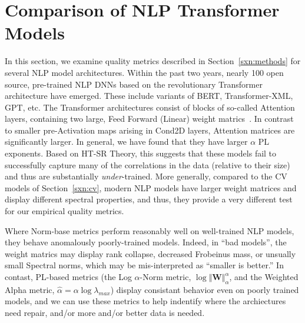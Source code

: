 \section{Comparison of NLP Transformer Models}
\label{sxn:nlp}

In this section, we examine quality metrics described in Section~\ref{sxn:methods} for several NLP model architectures.
%
Within the past two years, nearly 100 open source, pre-trained NLP DNNs based on the revolutionary Transformer architecture have emerged.
These include variants of BERT, Transformer-XML, GPT, etc.
%
The Transformer architectures consist of blocks of so-called Attention layers, containing two large, Feed Forward (Linear) weight matrics~\cite{Attn2017}. 
In contrast to smaller pre-Activation maps arising in Cond2D layers, Attention matrices are significantly larger.
In general, we have found that they have larger $\alpha$ PL exponents.
Based on HT-SR Theory, 
this suggests that these models fail to successfully capture many of the correlations in the data (relative to their size) and thus are substantially \emph{under}-trained.
%
More generally, compared to the CV models of Section~\ref{sxn:cv},
modern NLP models have larger weight matrices and display different spectral properties, and 
thus, they provide a very different test for our empirical quality metrics.

Where Norm-base metrics perform reasonably well on well-trained NLP models, they behave anomalously poorly-trained models.
Indeed, in ``bad models'', the weight matrics may display rank collapse, decreased Frobeinus mass, or unsually small Spectral norms, 
which may be mis-interpreted as ``smaller is better.''
In contast, PL-based metrics (the Log $\alpha$-Norm metric, $\log\Vert\mathbf{W}\Vert_{\alpha}^{\alpha}$, and the Weighted Alpha metric, $\hat\alpha =\alpha\log\lambda_{max} $) display consistant behavior even on poorly trained models, and we can use these metrics to help indentify
where the archiectures need repair, and/or more and/or better data is needed.


